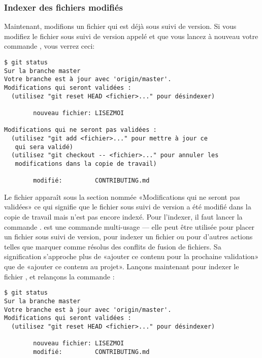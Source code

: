 \subsubsection{Indexer des fichiers modifiés}

Maintenant, modifions un fichier qui est déjà sous suivi de version.
Si vous modifiez le fichier sous suivi de version appelé  et que vous lancez à nouveau votre commande , vous verrez ceci:
\begin{Schunk}
\begin{Verbatim}
$ git status
Sur la branche master
Votre branche est à jour avec 'origin/master'.
Modifications qui seront validées :
  (utilisez "git reset HEAD <fichier>..." pour désindexer)

        nouveau fichier: LISEZMOI

Modifications qui ne seront pas validées :
  (utilisez "git add <fichier>..." pour mettre à jour ce
   qui sera validé)
  (utilisez "git checkout -- <fichier>..." pour annuler les
   modifications dans la copie de travail)

        modifié:         CONTRIBUTING.md
\end{Verbatim}
\end{Schunk}

Le fichier  apparaît sous la section nommée «Modifications qui ne seront pas validées» ce qui signifie que le fichier sous suivi de version a été modifié dans la copie de travail mais n'est pas encore indexé.
Pour l'indexer, il faut lancer la commande .  est une commande multi-usage --- elle peut être utilisée pour placer un fichier sous suivi de version, pour indexer un fichier ou pour d'autres actions telles que marquer comme résolus des conflits de fusion de fichiers.
Sa signification s'approche plus de «ajouter ce contenu pour la prochaine validation» que de «ajouter ce contenu au projet».
Lançons maintenant  pour indexer le fichier , et relançons la commande :
\begin{Schunk}
\begin{Verbatim}
$ git status
Sur la branche master
Votre branche est à jour avec 'origin/master'.
Modifications qui seront validées :
  (utilisez "git reset HEAD <fichier>..." pour désindexer)

        nouveau fichier: LISEZMOI
        modifié:         CONTRIBUTING.md

\end{Verbatim}
\end{Schunk}

